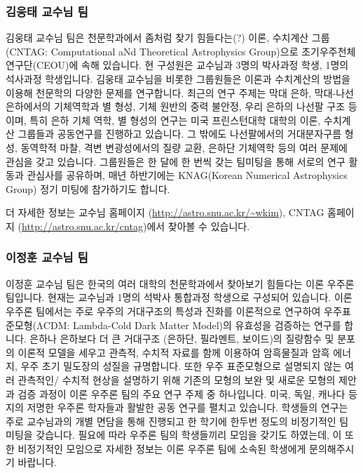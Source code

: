 \subsubsection{김웅태 교수님 팀}
김웅태 교수님 팀은 천문학과에서 좀처럼 찾기 힘들다는(?) 이론, 수치계산 그룹(CNTAG: Computational aNd Theoretical Astrophysics Group)으로 초기우주천체연구단(CEOU)에 속해 있습니다. 현 구성원은 교수님과 3명의 박사과정 학생, 1명의 석사과정 학생입니다.
  김웅태 교수님을 비롯한 그룹원들은 이론과 수치계산의 방법을 이용해 천문학의 다양한 문제를 연구합니다. 최근의 연구 주제는 막대 은하, 막대-나선 은하에서의 기체역학과 별 형성, 기체 원반의 중력 불안정, 우리 은하의 나선팔 구조 등이며, 특히 은하 기체 역학, 별 형성의 연구는 미국 프린스턴대학 대학의 이론, 수치계산 그룹들과 공동연구를 진행하고 있습니다. 그 밖에도 나선팔에서의 거대분자구름 형성, 동역학적 마찰, 격변 변광성에서의 질량 교환, 은하단 기체역학 등의 여러 문제에 관심을 갖고 있습니다.
  그룹원들은 한 달에 한 번씩 갖는 팀미팅을 통해 서로의 연구 활동과 관심사를 공유하며, 매년 하반기에는 KNAG(Korean Numerical Astrophysics Group) 정기 미팅에 참가하기도 합니다.

더 자세한 정보는 교수님 홈페이지 (\url{http://astro.snu.ac.kr/~wkim}), CNTAG 홈페이지 (\url{http://astro.snu.ac.kr/cntag})에서 찾아볼 수 있습니다.

\subsubsection{이정훈 교수님 팀}
 이정훈 교수님 팀은 한국의 여러 대학의 천문학과에서 찾아보기 힘들다는 이론 우주론 팀입니다. 현재는 교수님과 1명의 석박사 통합과정 학생으로 구성되어 있습니다. 이론 우주론 팀에서는 주로 우주의 거대구조의 특성과 진화를 이론적으로 연구하여 우주표준모형($\mathrm{\Lambda CDM}$: Lambda-Cold Dark Matter Model)의 유효성을 검증하는  연구를 합니다. 은하나 은하보다 더 큰 거대구조 (은하단, 필라멘트, 보이드)의 질량함수 및 분포의 이론적 모델을 세우고 관측적, 수치적 자료를 함께 이용하여 암흑물질과 암흑 에너지, 우주 초기 밀도장의 성질을 규명합니다. 
 또한 우주 표준모형으로 설명되지 않는 여러 관측적인/ 수치적 현상을 설명하기 위해 기존의 모형의 보완 및 새로운 모형의 제안과 검증 과정이 이론 우주론 팀의 주요 연구 주제 중 하나입니다. 미국, 독일, 캐나다 등지의 저명한 우주론 학자들과 활발한 공동 연구를 펼치고 있습니다. 학생들의 연구는 주로 교수님과의 개별 면담을 통해 진행되고 한 학기에 한두번 정도의 비정기적인 팀 미팅을 갖습니다. 필요에 따라 우주론 팀의 학생들끼리 모임을 갖기도 하였는데, 이 또한 비정기적인 모임으로 자세한 정보는 이론 우주론 팀에 소속된 학생에게 문의해주시기 바랍니다.

